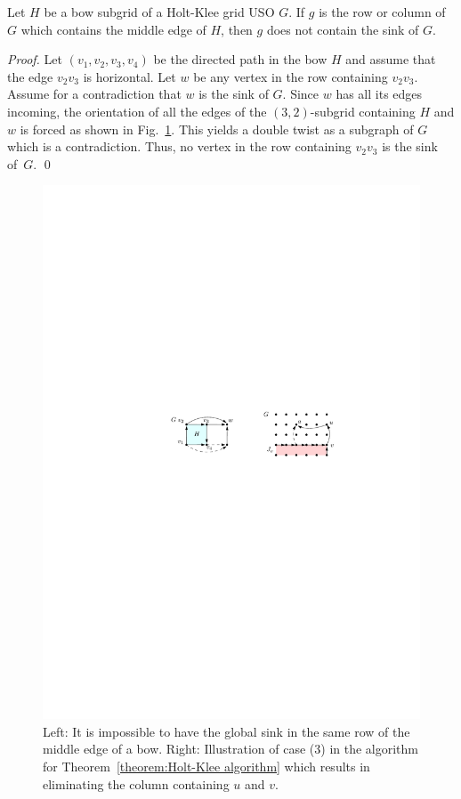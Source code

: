 \documentclass[runningheads,a4paper]{llncs}
\begin{document}
\begin{lemma}\label{lemma:bow lemma}
Let $H$ be a bow subgrid of a Holt-Klee grid USO $G$. If $g$ is the row or column of $G$ which contains the middle edge of $H$, then $g$ does not contain the sink of $G$.
\end{lemma}
\begin{proof}
Let $(v_1, v_2, v_3,v_4)$ be the directed path in the bow $H$ and assume that the edge $v_2v_3$ is horizontal. 
Let $w$ be any vertex in the row containing $v_2v_3$.  
Assume for a contradiction that $w$ is the sink of $G$. 
Since $w$ has all its edges incoming, the orientation of all the edges of the $(3,2)$-subgrid containing $H$ and $w$ is forced as shown in Fig.~\ref{fig:Bow example}. This yields a double twist as a subgraph of $G$ which is a contradiction. Thus, no vertex in the row containing $v_2v_3$ is the sink of~$G$. \qed
\end{proof}

\begin{figure}[tb]
\centering
\includegraphics{HoltKlee.pdf}
\caption{\small Left: It is impossible to have the global sink in the same row of the middle edge of a bow. Right: Illustration of case (3) in the algorithm for Theorem~\ref{theorem:Holt-Klee algorithm} which results in eliminating the column containing $u$ and $v$.}
\label{fig:Bow example}
\end{figure}
\end{document}
